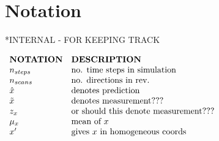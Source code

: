 \section{Notation}
*INTERNAL - FOR KEEPING TRACK

$
\begin{array}{ll}
	\textbf{NOTATION} 	& \textbf{DESCRIPTION}\\
	n_{steps}			& \textnormal{no. time steps in simulation}\\
	n_{scans}			& \textnormal{no. directions in rev.}\\
	\hat{x}	 			& \textnormal{denotes prediction}\\
	\tilde{x}	 		& \textnormal{denotes measurement???}\\
	z_x					& \textnormal{or should this denote measurement???}\\
	\mu_x		 		& \textnormal{mean of } x\\
	x'					& \textnormal{gives } x \textnormal{ in homogeneous coords}
\end{array}
$